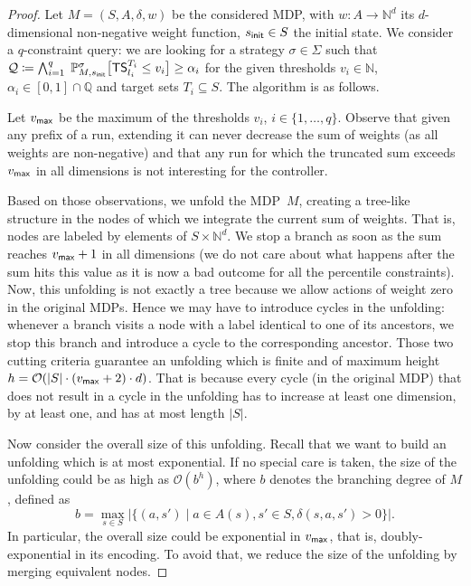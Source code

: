 \documentclass{llncs}
\newcommand{\states}{\ensuremath{S} }
\newcommand{\initState}{\ensuremath{s_{{\sf init}}} }
\newcommand{\weight}{\ensuremath{w} }
\newcommand{\markovProcess}{\ensuremath{{M} }}
\newcommand{\strat}{\ensuremath{\sigma} }
\newcommand*{\pr}{\mathbb{P}}
\newcommand{\truncatedTarget}{\ensuremath{T} }
\newcommand{\truncatedSum}[1]{\ensuremath{{\sf TS}^{#1}} }
\newcommand{\dimension}{\ensuremath{d} }
\newcommand{\queries}{\ensuremath{q} }
\newcommand{\nat}{\ensuremath{\mathbb{N}} }
\newcommand{\rat}{\ensuremath{\mathbb{Q}} }
\newcommand{\strats}{\ensuremath{\Sigma} }
\newcommand{\query}{\ensuremath{\mathcal{Q}} }
\begin{document}
\begin{proof}
Let $\markovProcess = (\states, A, \delta, \weight)$ be the considered MDP,  with $w\colon A \rightarrow \nat^{d}$ its $\dimension$-dimensional non-negative weight function, $\initState \in \states$ the initial state. We consider a $\queries$-constraint query: we are looking for a strategy $\strat \in \strats$ such that
$\query \coloneqq \bigwedge_{i = 1}^{q}\; \pr_{M,\initState}^\strat\big[\truncatedSum{\truncatedTarget_{i}}_{l_{i}} \leq v_i\big] \geq
	\alpha_i$
for the given thresholds $v_i \in \nat$, $\alpha_i \in [0, 1] \cap \rat$ and target sets $\truncatedTarget_{i} \subseteq \states$. The algorithm is as follows.

Let $v_{{\sf max}}$ be the maximum of the thresholds $v_i$, $i \in \{1, \ldots{}, \queries\}$. Observe that given any prefix of a run, extending it can never decrease the sum of weights (as all weights are non-negative) and that any run for which the truncated sum exceeds~$v_{{\sf max}}$ in all dimensions is not interesting for the controller.

Based on those observations, we unfold the MDP~$\markovProcess$, creating a tree-like structure in the nodes of which we integrate the current sum of weights. That is, nodes are labeled by elements of $\states \times \nat^{\dimension}$. We stop a branch as soon as the sum reaches $v_{{\sf max}}+1$ in all dimensions (we do not care about what happens after the sum hits this value as it is now a bad outcome for all the percentile constraints). Now, this unfolding is not exactly a tree because we allow actions of weight zero in the original MDPs. Hence we may have to introduce cycles in the unfolding: whenever a branch visits a node with a label identical to one of its ancestors, we stop this branch and introduce a cycle to the corresponding ancestor. Those two cutting criteria guarantee an unfolding which is finite and of maximum height $h = \mathcal{O}(\vert\states\vert \cdot (v_{{\sf max}}+2) \cdot \dimension)$. That is because every cycle (in the original MDP) that does not result in a cycle in the unfolding has to increase at least one dimension, by at least one, and has at most length $\vert \states \vert$.

Now consider the overall size of this unfolding. Recall that we want to build an unfolding which is at most exponential. If no special care is taken, the size of the unfolding could be as high as $\mathcal{O}(b^{h})$, where $b$ denotes the branching degree of $\markovProcess$, defined as
\begin{equation*}
b = \max_{s \in \states} \big\vert \{(a, s') \mid a \in A(s), s' \in \states, \delta(s,a,s') > 0\} \big\vert.
\end{equation*}
In particular, the overall size could be exponential in $v_{{\sf max}}$, that is, doubly-exponential in its encoding. To avoid that, we reduce the size of the unfolding by merging equivalent nodes.


\end{proof}
\end{document}
